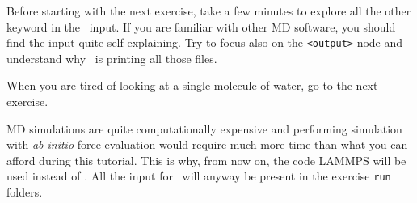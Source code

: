 \documentclass{article}
\begin{document}
Before starting with the next exercise, take a few minutes to explore
all the other keyword in the \ipi\ input. If you are familiar with
other MD software, you should find the input quite self-explaining.
Try to focus also on the \texttt{<output>} node and understand why
\ipi\ is printing all those files.


When you are tired of looking at a single molecule of water, go to the
next exercise.

MD simulations are quite computationally expensive and performing
simulation with \emph{ab-initio} force evaluation would require much
more time than what you can afford during this tutorial. This is why,
from now on, the code LAMMPS will be used instead of \qe. All the
input for \qe\ will anyway be present in the exercise \texttt{run} folders.

\vspace{2em}
\end{document}
